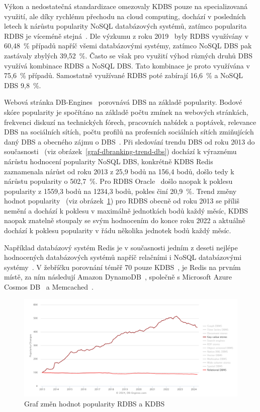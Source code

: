 \documentclass[czech,master,dept460,male,csharp,cpdeclaration]{diploma}
\begin{document}
	Výkon a nedostatečná standardizace omezovaly KDBS pouze na specializovaná využití, ale díky rychlému přechodu na cloud computing, dochází v posledních letech k nárůstu popularity NoSQL databázových systémů, zatímco popularita RDBS je víceméně stejná~\cite{dbranking-trend-by-model}. Dle výzkumu z roku 2019~\cite{scalegrid-sql-vs-nosql} byly RDBS využívány v 60,48~\% případů napříč všemi databázovými systémy, zatímco NoSQL DBS pak zastávaly zbylých 39,52~\%. Často se však pro využití výhod různých druhů DBS využívá kombinace RDBS a NoSQL DBS. Tato kombinace je proto využívána v 75,6~\% případů. Samostatně využívané RDBS poté zabírají 16,6~\% a NoSQL DBS 9,8~\%. 
	
	Webová stránka DB-Engines~\cite{dbranking-web-index} porovnává DBS na základě popularity. Bodové skóre popularity je spočítáno na základě počtu zmínek na webových stránkách, frekvenci diskuzí na technických fórech, pracovních nabídek a poptávek, relevance DBS na sociálních sítích, počtu profilů na profesních sociálních sítích zmiňujících daný DBS a obecného zájmu o DBS~\cite{dbranking-ranking-definition}. Při sledování trendu DBS od roku 2013 do současnosti~\cite{dbranking-trend-by-dbs} (viz obrázek~\ref{graf-dbranking-trend-dbs}) dochází k výraznému nárůstu hodnocení popularity NoSQL DBS, konkrétně KDBS Redis~\cite{redis} zaznamenala nárůst od roku 2013 z 25,9 bodů na 156,4 bodů, došlo tedy k nárůstu popularity o 502,7~\%. Pro RDBS Oracle~\cite{oracle-index} došlo naopak k poklesu popularity z 1559,3 bodů na 1234,3 bodů, pokles činí 20,9~\%. Trend změny hodnot popularity~\cite{dbranking-trend-by-model} (viz obrázek~\ref{graf-dbranking-trend-model}) pro RDBS obecně od roku 2013 se příliš nemění a dochází k poklesu v maximálně jednotkách bodů každý měsíc, KDBS naopak znatelně stoupaly se svým hodnocením do konce roku 2022 a aktuálně dochází k poklesu popularity v řádu několika jednotek bodů každý měsíc.
	
	Například databázový systém Redis je v současnosti jedním z deseti nejlépe hodnocených databázových systémů napříč relačními i NoSQL databázovými systémy~\cite{db-engineers-ranking}. V žebříčku porovnání téměř 70 pouze KDBS~\cite{db-engineers-ranking-kdbs}, je Redis na prvním místě, za ním následují Amazon DynamoDB~\cite{dynamodb}, společně s Microsoft Azure Cosmos DB~\cite{azure-cosmos-db} a Memcached~\cite{memcached}.

	\begin{figure}
		\centering
		\includegraphics[scale=0.65]{Data/db-engine-trend-model.PNG}
		\caption{Graf změn hodnot popularity RDBS a KDBS~\cite{dbranking-trend-by-model}\label{graf-dbranking-trend-model}}
	\end{figure}
	
\end{document}
